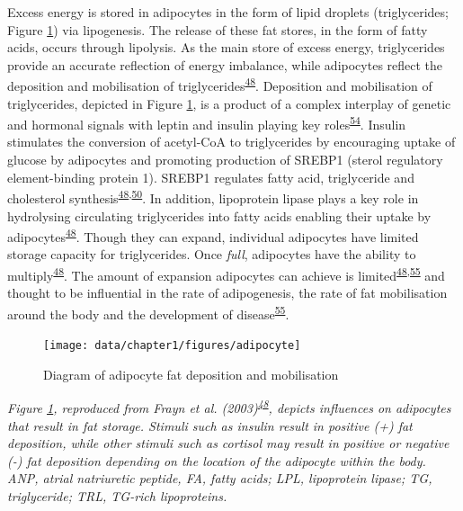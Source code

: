 \documentclass[11pt,twoside]{bristolthesis}
\newcommand{\bsmall}{\begin{small}}
\newcommand{\esmall}{\end{small}}
\begin{document}
Excess energy is stored in adipocytes in the form of lipid droplets (triglycerides; Figure \ref{fig:adipocyte}) via lipogenesis. The release of these fat stores, in the form of fatty acids, occurs through lipolysis. As the main store of excess energy, triglycerides provide an accurate reflection of energy imbalance, while adipocytes reflect the deposition and mobilisation of triglycerides\textsuperscript{\protect\hyperlink{ref-Frayn2003}{48}}. Deposition and mobilisation of triglycerides, depicted in Figure \ref{fig:adipocyte}, is a product of a complex interplay of genetic and hormonal signals with leptin and insulin playing key roles\textsuperscript{\protect\hyperlink{ref-Amitani2013}{54}}. Insulin stimulates the conversion of acetyl-CoA to triglycerides by encouraging uptake of glucose by adipocytes and promoting production of SREBP1 (sterol regulatory element-binding protein 1). SREBP1 regulates fatty acid, triglyceride and cholesterol synthesis\textsuperscript{\protect\hyperlink{ref-Frayn2003}{48},\protect\hyperlink{ref-Luo2016}{50}}. In addition, lipoprotein lipase plays a key role in hydrolysing circulating triglycerides into fatty acids enabling their uptake by adipocytes\textsuperscript{\protect\hyperlink{ref-Frayn2003}{48}}. Though they can expand, individual adipocytes have limited storage capacity for triglycerides. Once \emph{full}, adipocytes have the ability to multiply\textsuperscript{\protect\hyperlink{ref-Frayn2003}{48}}. The amount of expansion adipocytes can achieve is limited\textsuperscript{\protect\hyperlink{ref-Frayn2003}{48},\protect\hyperlink{ref-Gray2007}{55}} and thought to be influential in the rate of adipogenesis, the rate of fat mobilisation around the body and the development of disease\textsuperscript{\protect\hyperlink{ref-Gray2007}{55}}.

\par
\begin{figure}
\texttt{[image: data/chapter1/figures/adipocyte]} \caption{Diagram of adipocyte fat deposition and mobilisation}\label{fig:adipocyte}
\end{figure}
\noindent
\bsmall
\emph{Figure \ref{fig:adipocyte}, reproduced from Frayn et al. (2003)\textsuperscript{\protect\hyperlink{ref-Frayn2003}{48}}, depicts influences on adipocytes that result in fat storage. Stimuli such as insulin result in positive (+) fat deposition, while other stimuli such as cortisol may result in positive or negative (-) fat deposition depending on the location of the adipocyte within the body. ANP, atrial natriuretic peptide, FA, fatty acids; LPL, lipoprotein lipase; TG, triglyceride; TRL, TG-rich lipoproteins.}
\esmall
\end{document}
